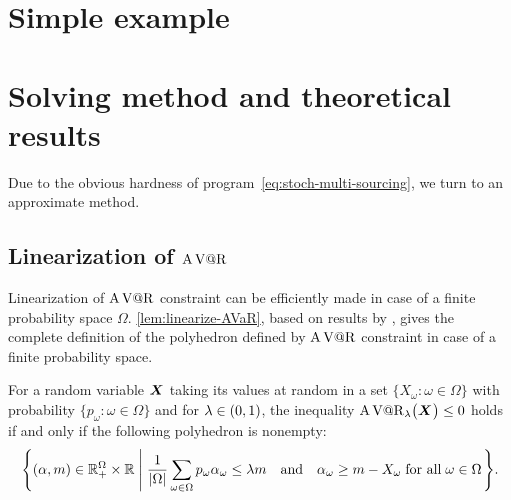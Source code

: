 \section{Simple example}




\section{Solving method and theoretical results}


Due to the obvious hardness of program~\eqref{eq:stoch-multi-sourcing}, we turn to an approximate method.


\subsection{Linearization of $\operatorname{A\operatorname{V@R}}$}
\label{sec:multi-sourcing:stochastic:avar-linearization}


Linearization of $\operatorname{A\operatorname{V@R}}$ constraint can be efficiently made in case of a finite probability space $\Omega$.
\cref{lem:linearize-AVaR}, based on results by \cite{Rockafellar2000}, gives the complete definition of the polyhedron defined by $\operatorname{A\operatorname{V@R}}$ constraint in case of a finite probability space.


\begin{lem}\label{lem:linearize-AVaR}
For a random variable $\va X$ taking its values at random in a set $\{X_{\omega}\colon\omega\in\Omega\}$ with probability $\{p_{\omega}\colon\omega\in\Omega\}$ and for $\lambda\in\bracket{0,1}$, the inequality 
$\AVaR_{\lambda}\bracket{\va X} \le 0$ holds if and only if the following polyhedron is nonempty:
$$
\left\{
\bracket{\alpha,m}\in\RR_+^{\Omega}\times\RR
\;\left|\;
\frac{1}{\card{\Omega}}\sum_{\omega\in\Omega}p_{\omega}\alpha_{\omega}\leq \lambda m
\quad\mbox{\textup{and}}\quad
\alpha_{\omega}\geq m-X_{\omega}\;
\mbox{\textup{for all}}\;\omega\in\Omega
\right.
\right\}.
$$
\end{lem}



